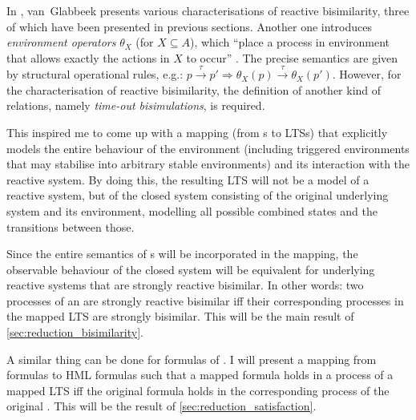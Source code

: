 %
\begin{isabellebody}%
%
%
\isadelimtheory
%
\endisadelimtheory
%
\isatagtheory
%
\endisatagtheory
{\isafoldtheory}%
%
\isadelimtheory
%
\endisadelimtheory
%
\isadelimdocument
%
\endisadelimdocument
%
\isatagdocument
%
\isamarkuptrue%
%
\endisatagdocument
{\isafolddocument}%
%
\isadelimdocument
%
\endisadelimdocument
%
\begin{isamarkuptext}%
\label{chap:reductions}%
\end{isamarkuptext}\isamarkuptrue%
%
\begin{isamarkuptext}%
In \cite{rbs}, van~Glabbeek presents various characterisations of reactive bisimilarity, three of which have been presented in previous sections. Another one introduces \emph{environment operators} $\theta_X$ (for $X \subseteq A$), which \enquote{place a process in  environment that allows exactly the actions in $X$ to occur} \cite[section 4]{rbs}. The precise semantics are given by structural operational rules, e.g.: $p \xrightarrow{\tau} p' \Longrightarrow \theta_X(p) \xrightarrow{\tau} \theta_X(p')$. However, for the characterisation of reactive bisimilarity, the definition of another kind of relations, namely \emph{time-out bisimulations}, is required. 

This inspired me to come up with a mapping (from \LTSt{}s to LTSs) that explicitly models the entire behaviour of the environment (including triggered environments that may stabilise into arbitrary stable environments) and its interaction with the reactive system. By doing this, the resulting LTS will not be a model of a reactive system, but of the closed system consisting of the original underlying system and its environment, modelling all possible combined states and the transitions between those.

Since the entire semantics of \LTSt{}s will be incorporated in the mapping, the observable behaviour of the closed system will be equivalent for underlying reactive systems that are strongly reactive bisimilar. In other words: two processes of an \LTSt{} are strongly reactive bisimilar iff their corresponding processes in the mapped LTS are strongly bisimilar. This will be the main result of \cref{sec:reduction_bisimilarity}.

A similar thing can be done for formulas of \HMLt{}. I will present a mapping from \HMLt{} formulas to HML formulas such that a mapped formula holds in a process of a mapped LTS iff the original formula holds in the corresponding process of the original \LTSt{}. This will be the result of \cref{sec:reduction_satisfaction}.%
\end{isamarkuptext}\isamarkuptrue%
%
\isadelimtheory
%
\endisadelimtheory
%
\isatagtheory
%
\endisatagtheory
{\isafoldtheory}%
%
\isadelimtheory
%
\endisadelimtheory
%
\end{isabellebody}%
\endinput
